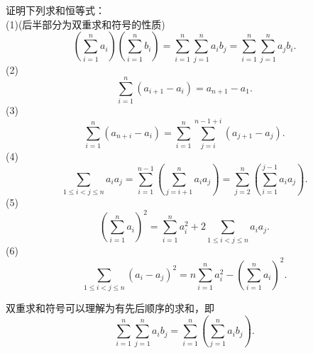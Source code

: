 \documentclass[lang=cn, zihao=5]{elegantbook}
\newcommand{\ssb}[1]{\left( #1 \right)}
\begin{document}
\begin{example}
	证明下列求和恒等式：\\
	(1)(后半部分为双重求和符号的性质)$$\ssb{\sum_{i=1}^{n}a_i} \ssb{\sum_{i=1}^{n}b_i} = \sum_{i=1}^{n}\sum_{j=1}^{n} a_ib_j = \sum_{i=1}^{n}\sum_{j=1}^{n} a_jb_i.$$
	(2)$$\sum_{i=1}^{n}(a_{i+1}-a_i)=a_{n+1}-a_1.$$
	(3)$$\sum_{i=1}^{n} (a_{n+i}-a_i) = \sum_{i=1}^n \sum_{j=i}^{n-1+i}(a_{j+1}-a_j).$$
	(4)$$\sum_{1 \leq i < j \leq n}a_ia_j = \sum_{i=1}^{n-1} \ssb{\sum_{j=i+1}^{n} a_ia_j} = \sum_{j=2}^{n} \ssb{\sum_{i=1}^{j-1} a_ia_j}.$$
	(5)$$\ssb{\sum_{i=1}^n a_i}^2 = \sum_{i=1}^{n} a_i^2 + 2\sum_{1 \leq i < j \leq n}a_ia_j.$$
	(6)$$\sum_{1 \leq i < j \leq n}(a_i-a_j)^2 = n\sum_{i=1}^{n} a_i^2 - \ssb{\sum_{i=1}^{n} a_i}^2.$$
\end{example}
\begin{remark}
	双重求和符号可以理解为有先后顺序的求和，即$$\sum_{i=1}^{n}\sum_{j=1}^{n} a_ib_j = \sum_{i=1}^{n} \ssb{\sum_{j=1}^{n} a_ib_j}.$$
\end{remark}
\end{document}
